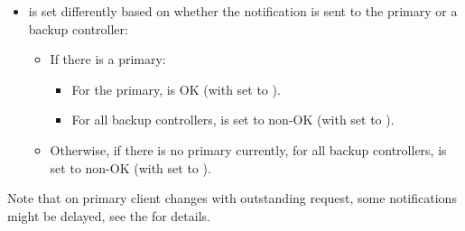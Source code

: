 \documentclass[11pt]{article}
\begin{document}
{\begin{itemize}
\item{}
 is set differently based on whether the notification is sent to the
primary or a backup controller:%

\begin{itemize}%

\item{}
If there is a primary:%

\begin{itemize}%

\item{}
For the primary,  is OK (with  set to
).%

\item{}
For all backup controllers,  is set to non-OK (with
 set to ).%
\end{itemize}%

\item{}
Otherwise, if there is no primary currently, for all backup controllers,
 is set to non-OK (with  set to
).%
\end{itemize}%
\end{itemize}%

\noindent{}Note that on primary client changes with outstanding  request, some
notifications might be delayed, see the
 for details.%

}
\end{document}
